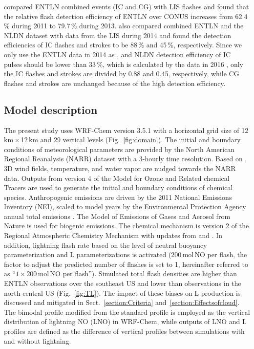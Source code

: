 \documentclass[amt]{copernicus}
\begin{document}
\citet{Rudlosky.2015} compared ENTLN combined events (IC and CG) with LIS flashes and found that the relative flash detection efficiency of ENTLN over CONUS increases from 62.4\,{\%} during 2011 to 79.7\,{\%} during 2013.
\citet{Lapierre.2020} also compared combined ENTLN and the NLDN dataset with data from the LIS during 2014 and found the detection efficiencies of IC flashes and strokes to be 88\,{\%} and 45\,{\%}, respectively.
Since we only use the ENTLN data in 2014 as \citet{Lapierre.2020}, and NLDN detection efficiency of IC pulses should be lower than 33\,{\%}, which is calculated by the data in 2016 \citep{Zhu.2016}, only the IC flashes and strokes are divided by 0.88 and 0.45, respectively, while CG flashes and strokes are unchanged because of the high detection efficiency.

\subsection{Model description}
The present study uses WRF-Chem version 3.5.1 \citep{Grell.2005} with a horizontal grid size of 12\,km\,$\times$\,12\,km and 29 vertical levels (Fig.~\ref{fig:domain}).
The initial and boundary conditions of meteorological parameters are provided by the North American Regional Reanalysis (NARR) dataset with a 3-hourly time resolution.
Based on \citet{Laughner.2019}, 3D wind fields, temperature, and water vapor are nudged towards the NARR data.
Outputs from version 4 of the Model for Ozone and Related chemical Tracers \citep[MOZART-4;][]{Emmons.2010} are used to generate the initial and boundary conditions of chemical species.
Anthropogenic emissions are driven by the 2011 National Emissions Inventory (NEI), scaled to model years by the Environmental Protection Agency annual total emissions \citep{EPA.2015}.
The Model of Emissions of Gases and Aerosol from Nature \citep[MEGAN;][]{Guenther.2006} is used for biogenic emissions.
The chemical mechanism is version 2 of the Regional Atmospheric Chemistry Mechanism \citep[RACM2;][]{Goliff.2013} with updates from \citet{Browne.2014} and \citet{Schwantes.2015}.
In addition, lightning flash rate based on the level of neutral buoyancy parameterization \citep{Price.1992,Wong.2013} and L parameterizations is activated (200\,mol\,NO per flash, the factor to adjust the predicted number of flashes is set to 1, hereinafter referred to as ``$1\times200$\,mol\,NO per flash'').
Simulated total flash densities are higher than ENTLN observations over the southeast US and lower than observations in the north-central US (Fig.~\ref{fig:TL}).
The impact of these biases on L production is discussed and mitigated in Sect.~\ref{section:Criteria} and~\ref{section:Effectsofcloud}.
The bimodal profile modified from the standard \citet{Ott.2010} profile \citep{Laughner.2017} is employed as the vertical distribution of lightning NO (LNO) in WRF-Chem, while outputs of LNO and L profiles are defined as the difference of vertical profiles between simulations with and without lightning.
\end{document}
